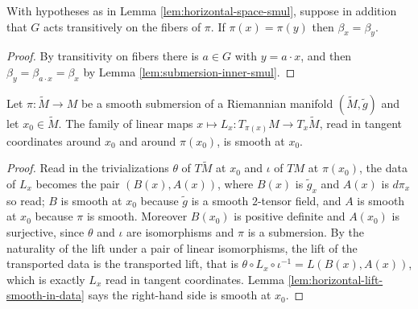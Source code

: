\begin{lemma}
\label{lem:submersion-inner-congr}
\leanok
{}
With hypotheses as in Lemma \ref{lem:horizontal-space-smul}, suppose in addition that $G$ acts transitively on the fibers of $\pi$. If $\pi(x) = \pi(y)$ then $\beta_x = \beta_y$.
\end{lemma}

\begin{proof}
\leanok
{}
By transitivity on fibers there is $a \in G$ with $y = a \cdot x$, and then $\beta_y = \beta_{a \cdot x} = \beta_x$ by Lemma \ref{lem:submersion-inner-smul}.
\end{proof}

\begin{lemma}
\label{lem:horizontal-lift-in-coordinates-smooth}
\leanok
{}
Let $\pi : \tilde{M} \to M$ be a smooth submersion of a Riemannian manifold $(\tilde{M},\tilde{g})$ and let $x_0 \in \tilde{M}$. The family of linear maps $x \mapsto L_x : T_{\pi(x)}M \to T_x\tilde{M}$, read in tangent coordinates around $x_0$ and around $\pi(x_0)$, is smooth at $x_0$.
\end{lemma}

\begin{proof}
\leanok
{}
Read in the trivializations $\theta$ of $T\tilde{M}$ at $x_0$ and $\iota$ of $TM$ at $\pi(x_0)$, the data of $L_x$ becomes the pair $(B(x), A(x))$, where $B(x)$ is $\tilde{g}_x$ and $A(x)$ is $d\pi_x$ so read; $B$ is smooth at $x_0$ because $\tilde{g}$ is a smooth $2$-tensor field, and $A$ is smooth at $x_0$ because $\pi$ is smooth. Moreover $B(x_0)$ is positive definite and $A(x_0)$ is surjective, since $\theta$ and $\iota$ are isomorphisms and $\pi$ is a submersion. By the naturality of the lift under a pair of linear isomorphisms, the lift of the transported data is the transported lift, that is $\theta \circ L_x \circ \iota^{-1} = L(B(x), A(x))$, which is exactly $L_x$ read in tangent coordinates. Lemma \ref{lem:horizontal-lift-smooth-in-data} says the right-hand side is smooth at $x_0$.
\end{proof}

